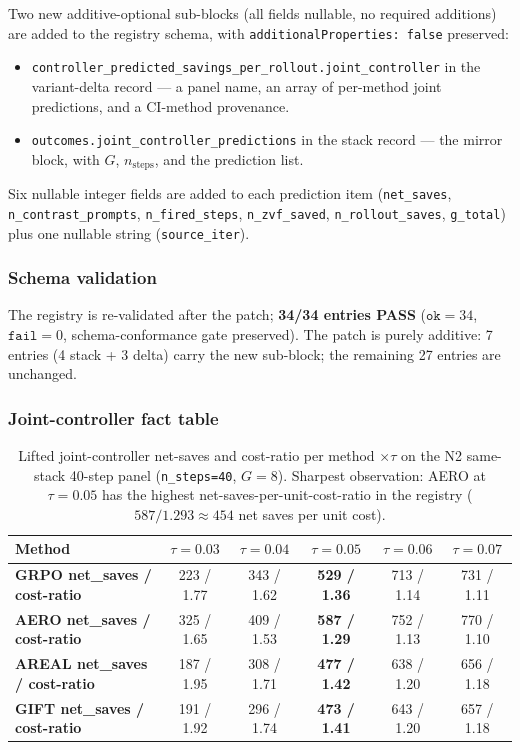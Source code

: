 \documentclass{article}
\begin{document}
Two new additive-optional sub-blocks (all fields nullable, no
required additions) are added to the registry schema, with
\texttt{additionalProperties: false} preserved:

\begin{itemize}
    \item \texttt{controller\_predicted\_savings\_per\_rollout.joint\_controller}
          in the variant-delta record --- a panel name, an array of
          per-method joint predictions, and a CI-method provenance.
    \item \texttt{outcomes.joint\_controller\_predictions} in the
          stack record --- the mirror block, with $G$, $n_\text{steps}$,
          and the prediction list.
\end{itemize}
Six nullable integer fields are added to each prediction item
(\texttt{net\_saves}, \texttt{n\_contrast\_prompts},
\texttt{n\_fired\_steps}, \texttt{n\_zvf\_saved},
\texttt{n\_rollout\_saves}, \texttt{g\_total}) plus one nullable
string (\texttt{source\_iter}).

\subsubsection{Schema validation}

The registry is re-validated after the patch; \textbf{34/34 entries
PASS} ($\texttt{ok}{=}34$, $\texttt{fail}{=}0$, schema-conformance
gate preserved). The patch is purely additive: 7 entries (4 stack +
3 delta) carry the new sub-block; the remaining 27 entries are
unchanged.

\subsubsection{Joint-controller fact table}\label{sec:p6-joint-controller-extension-table}

\begin{table}[t]
\centering\small
\caption{Lifted joint-controller net-saves and cost-ratio per
method $\times \tau$ on the N2 same-stack 40-step panel
(\texttt{n\_steps=40}, $G{=}8$). Sharpest observation: AERO at $\tau{=}0.05$
has the highest net-saves-per-unit-cost-ratio in the registry
($587 / 1.293 \approx 454$ net saves per unit cost).}
\label{tab:p6-joint-controller-extension}
\begin{tabular}{lccccc}
\toprule
Method & $\tau{=}0.03$ & $\tau{=}0.04$ & $\tau{=}0.05$ & $\tau{=}0.06$ & $\tau{=}0.07$ \\
\midrule
\textbf{GRPO net\_saves / cost-ratio} & 223 / 1.77 & 343 / 1.62 & \textbf{529 / 1.36} & 713 / 1.14 & 731 / 1.11 \\
\textbf{AERO net\_saves / cost-ratio} & 325 / 1.65 & 409 / 1.53 & \textbf{587 / 1.29} & 752 / 1.13 & 770 / 1.10 \\
\textbf{AREAL net\_saves / cost-ratio} & 187 / 1.95 & 308 / 1.71 & \textbf{477 / 1.42} & 638 / 1.20 & 656 / 1.18 \\
\textbf{GIFT net\_saves / cost-ratio} & 191 / 1.92 & 296 / 1.74 & \textbf{473 / 1.41} & 643 / 1.20 & 657 / 1.18 \\
\bottomrule
\end{tabular}
\end{table}
\end{document}

